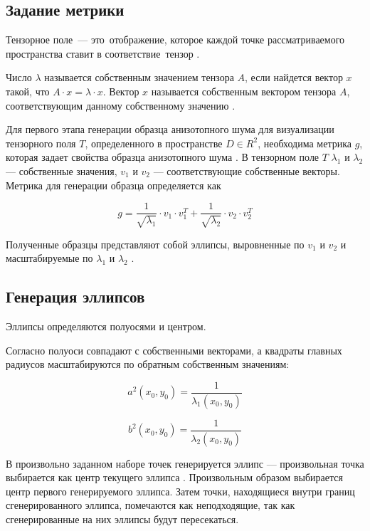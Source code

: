 \subsection{Задание метрики}

Тензорное поле --- это отображение, которое каждой точке рассматриваемого пространства ставит в соответствие тензор \cite{math1965}.

Число $\lambda$ называется собственным значением тензора $A$, если найдется вектор $x$ такой, что $A \cdot x = \lambda \cdot x$.
Вектор $x$ называется собственным вектором тензора $A$, соответствующим данному собственному значению \cite{vectorsmatrices}.

Для первого этапа генерации образца анизотопного шума для визуализации тензорного поля $T$, определенного в пространстве $D \in R^2$, необходима метрика $g$, которая задает свойства образца анизотопного шума \cite{feng2008anisotropic}.
В тензорном поле $T$ $\lambda_1$ и $\lambda_2$ --- собственные значения, $v_1$ и $v_2$ --- соответствующие собственные векторы.
Метрика для генерации образца определяется как

\begin{equation}\label{eq:metrics_g}
	g = \frac{1}{\sqrt{\lambda_1}}\cdot v_1\cdot v_1^T + \frac{1}{\sqrt{\lambda_2}}\cdot v_2\cdot v_2^T
\end{equation}

Полученные образцы представляют собой эллипсы, выровненные по $v_1$ и $v_2$ и масштабируемые по $\lambda_1$ и $\lambda_2$ \cite{feng2008anisotropic}.

\subsection{Генерация эллипсов}

Эллипсы определяются полуосями и центром.

Согласно \cite{feng2008anisotropic} полуоси совпадают с собственными векторами, а квадраты главных радиусов масштабируются по обратным собственным значениям:

\begin{equation}\label{eq:a_square}
	a^2(x_0,y_0)=\frac{1}{\lambda_1(x_0,y_0)}
\end{equation}

\begin{equation}\label{eq:b_square}
	b^2(x_0,y_0)=\frac{1}{\lambda_2(x_0,y_0)}
\end{equation}

В произвольно заданном наборе точек генерируется эллипс --- произвольная точка выбирается как центр текущего эллипса \cite{feng2008anisotropic}.
Произвольным образом выбирается центр первого генерируемого эллипса.
Затем точки, находящиеся внутри границ сгенерированного эллипса, помечаются как неподходящие, так как сгенерированные на них эллипсы будут пересекаться.

